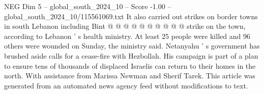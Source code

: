 \begin{textsample}{NEG Dim 5 – global\_south\_2024\_10 – Score -1.00 – global\_south\_2024\_10/115561069.txt}
It also carried out strikes on border towns in south Lebanon including Bint @ @ @ @ @ @ @ @ @ @ strike on the town, according to Lebanon ' s health ministry.
At least 25 people were killed and 96 others were wounded on Sunday, the ministry said.
Netanyahu ' s government has brushed aside calls for a cease-fire with Hezbollah.
His campaign is part of a plan to ensure tens of thousands of displaced Israelis can return to their homes in the north.
With assistance from Marissa Newman and Sherif Tarek.
This article was generated from an automated news agency feed without modifications to text.

\end{textsample}
